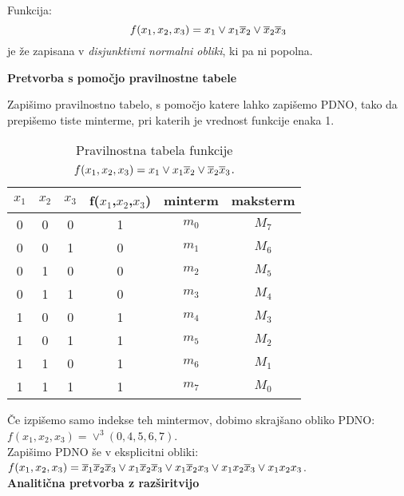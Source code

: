 \begin{resitev}
Funkcija:
$$
f(x_1,x_2,x_3) = x_1 \vee x_1 \overline x_2 \vee \overline x_2 \overline x_3
$$
je že zapisana v \textit{disjunktivni normalni obliki}, ki pa ni popolna. 

\bigskip

\textbf{Pretvorba s pomočjo pravilnostne tabele}

Zapišimo pravilnostno tabelo, s pomočjo katere lahko zapišemo PDNO, tako da prepišemo tiste minterme, pri katerih je vrednost funkcije enaka 1.\\
\begin{table}[ht]
\centering
\begin{tabular}{ccc|c|c|c}
$x_1$ & $x_2$ & $x_3$ & f($x_1$,$x_2$,$x_3$) & minterm & maksterm\\
\hline
0 & 0 & 0 & 1 & $m_0$ & $M_7$ \\
0 & 0 & 1 & 0 & $m_1$ & $M_6$ \\
0 & 1 & 0 & 0 & $m_2$ & $M_5$ \\
0 & 1 & 1 & 0 & $m_3$ & $M_4$ \\
1 & 0 & 0 & 1 & $m_4$ & $M_3$ \\
1 & 0 & 1 & 1 & $m_5$ & $M_2$ \\
1 & 1 & 0 & 1 & $m_6$ & $M_1$ \\
1 & 1 & 1 & 1 & $m_7$ & $M_0$ \\
\end{tabular}
\caption{Pravilnostna tabela funkcije $f(x_1,x_2,x_3) = x_1 \vee x_1 \overline x_2 \vee \overline x_2 \overline x_3$.}
\end{table}


Če izpišemo samo indekse teh mintermov, dobimo skrajšano obliko PDNO:\\
\hspace*{5mm} $f(x_1,x_2,x_3)=\vee^3(0,4,5,6,7)$. \\

\bigskip
Zapišimo PDNO še v eksplicitni obliki: \\
\hspace*{5mm} $f(x_1,x_2,x_3)=\overline x_1 \overline x_2 \overline x_3 \vee x_1 \overline x_2 \overline x_3 \vee x_1 \overline x_2 x_3 \vee x_1 x_2 \overline x_3 \vee x_1 x_2 x_3$. \\

\textbf{Analitična pretvorba z razširitvijo}


\end{resitev}
